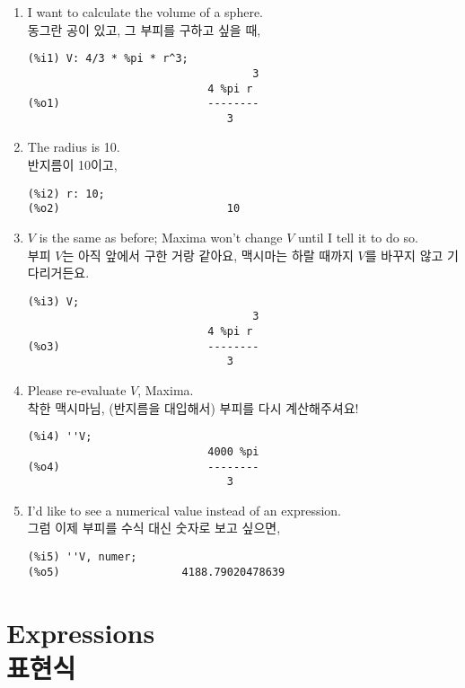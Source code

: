 \documentclass[12pt]{article}
\begin{document}
\begin{enumerate}

\item I want to calculate the volume of a sphere. \\ 동그란 공이 있고, 그 부피를 구하고 싶을 때, 
\begin{verbatim}
(%i1) V: 4/3 * %pi * r^3;
                                   3
                            4 %pi r
(%o1)                       --------
                               3
\end{verbatim}

\item The radius is 10. \\ 반지름이 10이고, 
\begin{verbatim}
(%i2) r: 10;
(%o2)                          10
\end{verbatim}

\item $V$ is the same as before; Maxima won't change $V$ until I tell it to do so. \\
부피 $V$는 아직 앞에서 구한 거랑 같아요, 맥시마는 하랄 때까지 $V$를 바꾸지 않고 기다리거든요.
\begin{verbatim}
(%i3) V;
                                   3
                            4 %pi r
(%o3)                       --------
                               3
\end{verbatim}

\item Please re-evaluate $V$, Maxima. \\착한 맥시마님, (반지름을 대입해서) 부피를 다시 계산해주셔요! 
\begin{verbatim}
(%i4) ''V;
                            4000 %pi
(%o4)                       --------
                               3
\end{verbatim}

\item I'd like to see a numerical value instead of an expression. \\ 그럼 이제 부피를 수식 대신 숫자로 보고 싶으면,
\begin{verbatim}
(%i5) ''V, numer;
(%o5)                   4188.79020478639
\end{verbatim}

\end{enumerate}

\section{Expressions \\ 표현식}
\end{document}

